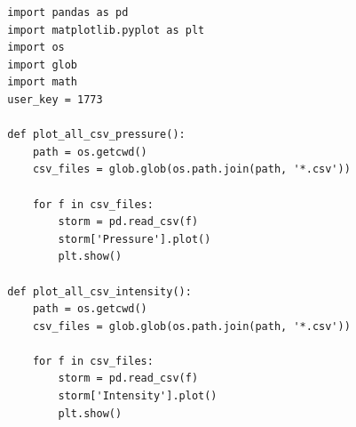 \documentclass[]{article}
\begin{document}
\begin{tcolorbox}[enhanced, 
    listing only,
    title=Python Code for Plotting CSV Data,
    fonttitle=\bfseries,
    colback=white,
    colframe=black!70,
    listing options={
      language=Python,
      numbers=left, 
      numberstyle=\tiny\color{gray},
      breaklines=true, 
      basicstyle=\ttfamily\small, 
      columns=fullflexible,
      keepspaces=true,
      showstringspaces=true,
    },]
    \begin{verbatim}
        import pandas as pd
        import matplotlib.pyplot as plt
        import os
        import glob
        import math
        user_key = 1773
        
        def plot_all_csv_pressure():
            path = os.getcwd()
            csv_files = glob.glob(os.path.join(path, '*.csv'))
            
            for f in csv_files:
                storm = pd.read_csv(f)
                storm['Pressure'].plot()
                plt.show()
        
        def plot_all_csv_intensity():
            path = os.getcwd()
            csv_files = glob.glob(os.path.join(path, '*.csv'))
            
            for f in csv_files:
                storm = pd.read_csv(f)
                storm['Intensity'].plot()
                plt.show()
    \end{verbatim}
\end{tcolorbox}
\end{document}
